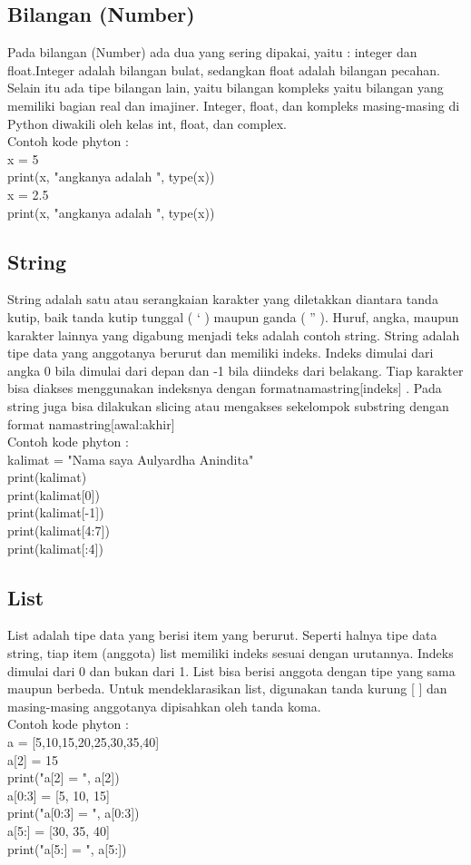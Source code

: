 \subsection{Bilangan (Number)}
Pada bilangan (Number) ada dua yang sering dipakai, yaitu : integer dan float.Integer adalah bilangan bulat, sedangkan float adalah bilangan pecahan. Selain itu ada tipe bilangan lain, yaitu bilangan kompleks yaitu bilangan yang memiliki bagian real dan imajiner. Integer, float, dan kompleks masing-masing di Python diwakili oleh kelas int, float, dan complex.\\
Contoh kode phyton :\\
x = 5 \\
print(x, "angkanya adalah ", type(x))\\
x = 2.5\\
print(x, "angkanya adalah ", type(x))\\

\subsection{String}
String adalah satu atau serangkaian karakter yang diletakkan diantara tanda kutip, baik tanda kutip tunggal ( ‘ ) maupun ganda ( ” ). Huruf, angka, maupun karakter lainnya yang digabung menjadi teks adalah contoh string. String adalah tipe data yang anggotanya berurut dan memiliki indeks. Indeks dimulai dari angka 0 bila dimulai dari depan dan -1 bila diindeks dari belakang. Tiap karakter bisa diakses menggunakan indeksnya dengan formatnamastring[indeks] . Pada string juga bisa dilakukan slicing atau mengakses sekelompok substring dengan format namastring[awal:akhir] \\
Contoh kode phyton :\\
kalimat = "Nama saya Aulyardha Anindita"\\
print(kalimat)\\
print(kalimat[0])\\
print(kalimat[-1])\\
print(kalimat[4:7])\\
print(kalimat[:4])\\

\subsection{List}
List adalah tipe data yang berisi item yang berurut. Seperti halnya tipe data string, tiap item (anggota) list memiliki indeks sesuai dengan urutannya. Indeks dimulai dari 0 dan bukan dari 1. List bisa berisi anggota dengan tipe yang sama maupun berbeda. Untuk mendeklarasikan list, digunakan tanda kurung [ ] dan masing-masing anggotanya dipisahkan oleh tanda koma.\\
Contoh kode phyton :\\
a = [5,10,15,20,25,30,35,40]\\
a[2] = 15\\
print("a[2] = ", a[2])\\
a[0:3] = [5, 10, 15]\\
print("a[0:3] = ", a[0:3])\\
a[5:] = [30, 35, 40]\\
print("a[5:] = ", a[5:])\\

